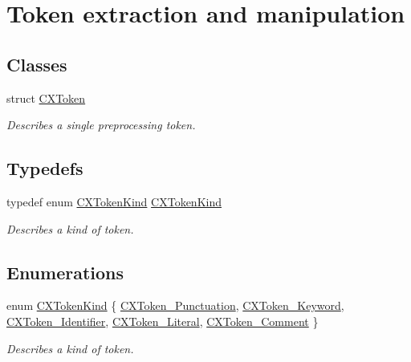 \hypertarget{group__CINDEX__LEX}{}\section{Token extraction and manipulation}
\label{group__CINDEX__LEX}
\subsection*{Classes}
\begin{DoxyCompactItemize}
\item 
struct \mbox{\hyperlink{structCXToken}{C\+X\+Token}}
\begin{DoxyCompactList}\small\item\em Describes a single preprocessing token. \end{DoxyCompactList}\end{DoxyCompactItemize}
\subsection*{Typedefs}
\begin{DoxyCompactItemize}
\item 
\mbox{\label{group__CINDEX__LEX_ga7271219ef4d52d9733d5a25aa2f49283}} 
typedef enum \mbox{\hyperlink{group__CINDEX__LEX_gaf63e37eee4280e2c039829af24bbc201}{C\+X\+Token\+Kind}} \mbox{\hyperlink{group__CINDEX__LEX_ga7271219ef4d52d9733d5a25aa2f49283}{C\+X\+Token\+Kind}}
\begin{DoxyCompactList}\small\item\em Describes a kind of token. \end{DoxyCompactList}\end{DoxyCompactItemize}
\subsection*{Enumerations}
\begin{DoxyCompactItemize}
\item 
enum \mbox{\hyperlink{group__CINDEX__LEX_gaf63e37eee4280e2c039829af24bbc201}{C\+X\+Token\+Kind}} \{ \newline
\mbox{\hyperlink{group__CINDEX__LEX_ggaf63e37eee4280e2c039829af24bbc201a463897af21adb6706fbfcf22ca4940b7}{C\+X\+Token\+\_\+\+Punctuation}}, 
\mbox{\hyperlink{group__CINDEX__LEX_ggaf63e37eee4280e2c039829af24bbc201a792baee6b6a166111c89bf542a75c089}{C\+X\+Token\+\_\+\+Keyword}}, 
\mbox{\hyperlink{group__CINDEX__LEX_ggaf63e37eee4280e2c039829af24bbc201a439a43b4d7a9fb0333c926dabb88d710}{C\+X\+Token\+\_\+\+Identifier}}, 
\mbox{\hyperlink{group__CINDEX__LEX_ggaf63e37eee4280e2c039829af24bbc201aafb7fbc9035a6523463b52fe69e8a5d6}{C\+X\+Token\+\_\+\+Literal}}, 
\newline
\mbox{\hyperlink{group__CINDEX__LEX_ggaf63e37eee4280e2c039829af24bbc201a6a24a53d8d4a4aa6e4bcb4847c9652f3}{C\+X\+Token\+\_\+\+Comment}}
 \}
\begin{DoxyCompactList}\small\item\em Describes a kind of token. \end{DoxyCompactList}\end{DoxyCompactItemize}
